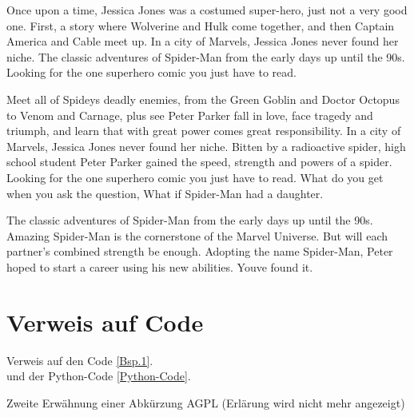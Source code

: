 Once upon a time, Jessica Jones was a costumed super-hero, just not a very good one. First, a story where Wolverine and Hulk come together, and then Captain America and Cable meet up. In a city of Marvels, Jessica Jones never found her niche. The classic adventures of Spider-Man from the early days up until the 90s. Looking for the one superhero comic you just have to read.

Meet all of Spideys deadly enemies, from the Green Goblin and Doctor Octopus to Venom and Carnage, plus see Peter Parker fall in love, face tragedy and triumph, and learn that with great power comes great responsibility. In a city of Marvels, Jessica Jones never found her niche. Bitten by a radioactive spider, high school student Peter Parker gained the speed, strength and powers of a spider. Looking for the one superhero comic you just have to read. What do you get when you ask the question, What if Spider-Man had a daughter.

The classic adventures of Spider-Man from the early days up until the 90s. Amazing Spider-Man is the cornerstone of the Marvel Universe. But will each partner’s combined strength be enough. Adopting the name Spider-Man, Peter hoped to start a career using his new abilities. Youve found it.

\section{Verweis auf Code}
Verweis auf den Code \autoref{Bsp.1}.\\
und der Python-Code \autoref{Python-Code}.

Zweite Erwähnung einer Abkürzung \ac{AGPL} (Erlärung wird nicht mehr angezeigt)